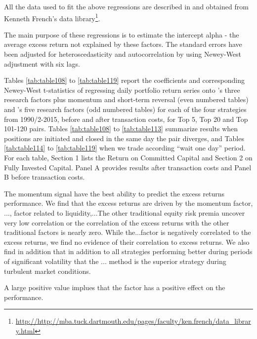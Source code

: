 \documentclass[a4paper]{article}
\begin{document}
	All the data used to fit the above regressions are described in and obtained from Kenneth French’s data library\footnote{\url{http://http://mba.tuck.dartmouth.edu/pages/faculty/ken.french/data_library.html}}.
	
	The main purpose of these regressions is to estimate the intercept alpha - the average excess return not explained by these factors. The standard errors have been adjusted for heteroscedasticity and autocorrelation by using Newey-West adjustment with six lags.
	
	Tables \ref{tab:table108} to \ref{tab:table119} report the coefficients and corresponding Newey-West t-statistics of regressing daily portfolio return series onto \citet*{ff93}'s three research factors plus momentum and short-term reversal (even numbered tables) and \citet*{ff15}'s five research factors (odd numbered tables) for each of the four strategies from 1990/2-2015, before and after transaction costs, for Top 5, Top 20 and Top 101-120 pairs. Tables \ref{tab:table108} to \ref{tab:table113} summarize results when positions are initiated and closed in the same day the pair diverges, and Tables \ref{tab:table114} to \ref{tab:table119} when we trade according ``wait one day'' period. For each table, Section 1 lists the Return on Committed Capital and Section 2 on Fully Invested Capital. Panel A provides results after transaction costs and Panel B before transaction costs.
	
	The momentum signal have the best ability to predict the excess returns performance. We find that the excess returns are driven by the momentum factor, ..., factor related to liquidity,...The other traditional equity risk premia uncover very low correlation or the correlation of the excess returns with the other traditional factors is nearly zero. While the...factor is negatively correlated to the excess returns, we find no evidence of their correlation to excess returns. We also find in addition that in addition to all strategies performing better during periods of significant volatility that the ... method is the superior strategy during turbulent market conditions.
	
	A large positive value implues that the factor has a positive effect on the performance. 
	
	
	
\end{document}
